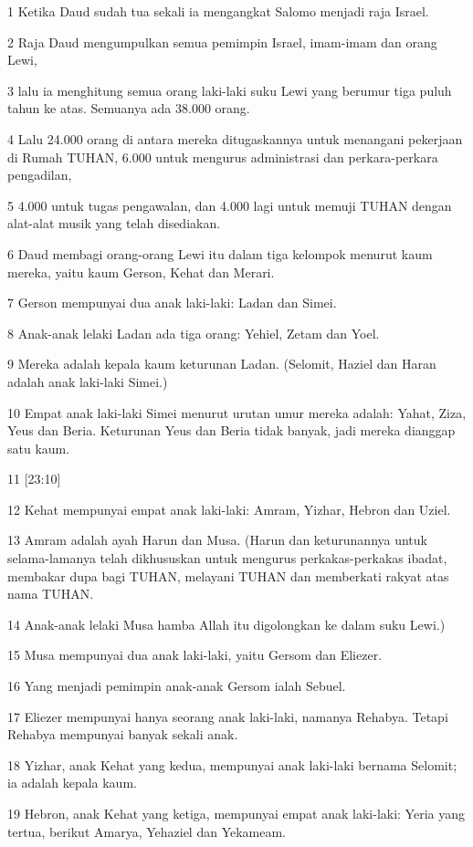 \par 1 Ketika Daud sudah tua sekali ia mengangkat Salomo menjadi raja Israel.
\par 2 Raja Daud mengumpulkan semua pemimpin Israel, imam-imam dan orang Lewi,
\par 3 lalu ia menghitung semua orang laki-laki suku Lewi yang berumur tiga puluh tahun ke atas. Semuanya ada 38.000 orang.
\par 4 Lalu 24.000 orang di antara mereka ditugaskannya untuk menangani pekerjaan di Rumah TUHAN, 6.000 untuk mengurus administrasi dan perkara-perkara pengadilan,
\par 5 4.000 untuk tugas pengawalan, dan 4.000 lagi untuk memuji TUHAN dengan alat-alat musik yang telah disediakan.
\par 6 Daud membagi orang-orang Lewi itu dalam tiga kelompok menurut kaum mereka, yaitu kaum Gerson, Kehat dan Merari.
\par 7 Gerson mempunyai dua anak laki-laki: Ladan dan Simei.
\par 8 Anak-anak lelaki Ladan ada tiga orang: Yehiel, Zetam dan Yoel.
\par 9 Mereka adalah kepala kaum keturunan Ladan. (Selomit, Haziel dan Haran adalah anak laki-laki Simei.)
\par 10 Empat anak laki-laki Simei menurut urutan umur mereka adalah: Yahat, Ziza, Yeus dan Beria. Keturunan Yeus dan Beria tidak banyak, jadi mereka dianggap satu kaum.
\par 11 [23:10]
\par 12 Kehat mempunyai empat anak laki-laki: Amram, Yizhar, Hebron dan Uziel.
\par 13 Amram adalah ayah Harun dan Musa. (Harun dan keturunannya untuk selama-lamanya telah dikhususkan untuk mengurus perkakas-perkakas ibadat, membakar dupa bagi TUHAN, melayani TUHAN dan memberkati rakyat atas nama TUHAN.
\par 14 Anak-anak lelaki Musa hamba Allah itu digolongkan ke dalam suku Lewi.)
\par 15 Musa mempunyai dua anak laki-laki, yaitu Gersom dan Eliezer.
\par 16 Yang menjadi pemimpin anak-anak Gersom ialah Sebuel.
\par 17 Eliezer mempunyai hanya seorang anak laki-laki, namanya Rehabya. Tetapi Rehabya mempunyai banyak sekali anak.
\par 18 Yizhar, anak Kehat yang kedua, mempunyai anak laki-laki bernama Selomit; ia adalah kepala kaum.
\par 19 Hebron, anak Kehat yang ketiga, mempunyai empat anak laki-laki: Yeria yang tertua, berikut Amarya, Yehaziel dan Yekameam.

